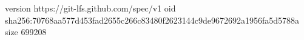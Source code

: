 version https://git-lfs.github.com/spec/v1
oid sha256:70768aa577d453fad2655c266c83480f2623144c9de9672692a1956fa5d5788a
size 699208
